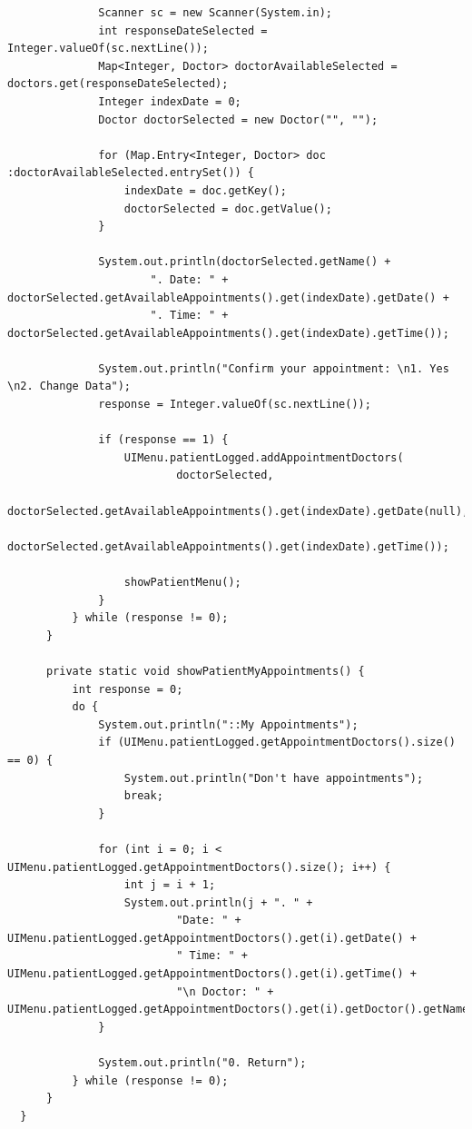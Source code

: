 \documentclass{article}
\begin{document}
\begin{verbatim}
              Scanner sc = new Scanner(System.in);
              int responseDateSelected = Integer.valueOf(sc.nextLine());
              Map<Integer, Doctor> doctorAvailableSelected = doctors.get(responseDateSelected);
              Integer indexDate = 0;
              Doctor doctorSelected = new Doctor("", "");

              for (Map.Entry<Integer, Doctor> doc :doctorAvailableSelected.entrySet()) {
                  indexDate = doc.getKey();
                  doctorSelected = doc.getValue();
              }

              System.out.println(doctorSelected.getName() +
                      ". Date: " + doctorSelected.getAvailableAppointments().get(indexDate).getDate() +
                      ". Time: " + doctorSelected.getAvailableAppointments().get(indexDate).getTime());

              System.out.println("Confirm your appointment: \n1. Yes \n2. Change Data");
              response = Integer.valueOf(sc.nextLine());

              if (response == 1) {
                  UIMenu.patientLogged.addAppointmentDoctors(
                          doctorSelected,
                          doctorSelected.getAvailableAppointments().get(indexDate).getDate(null),
                          doctorSelected.getAvailableAppointments().get(indexDate).getTime());

                  showPatientMenu();
              }
          } while (response != 0);
      }

      private static void showPatientMyAppointments() {
          int response = 0;
          do {
              System.out.println("::My Appointments");
              if (UIMenu.patientLogged.getAppointmentDoctors().size() == 0) {
                  System.out.println("Don't have appointments");
                  break;
              }

              for (int i = 0; i < UIMenu.patientLogged.getAppointmentDoctors().size(); i++) {
                  int j = i + 1;
                  System.out.println(j + ". " +
                          "Date: " + UIMenu.patientLogged.getAppointmentDoctors().get(i).getDate() +
                          " Time: " + UIMenu.patientLogged.getAppointmentDoctors().get(i).getTime() +
                          "\n Doctor: " + UIMenu.patientLogged.getAppointmentDoctors().get(i).getDoctor().getName());
              }

              System.out.println("0. Return");
          } while (response != 0);
      }
  }
\end{verbatim}
\end{document}
